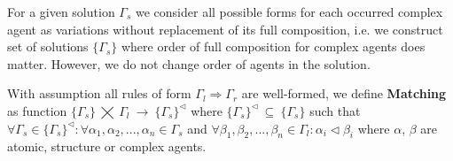 \documentclass{entcs}
\renewcommand{\~}[0]{\texttildelow}
\begin{document}
\begin{definition}
For a given solution $\Gamma_s$ we consider all possible forms for each occurred complex agent as variations without replacement of its full composition, i.e. we construct set of solutions $\{\Gamma_s\}$ where order of full composition for complex agents does matter. However, we do not change order of agents in the solution.
\end{definition}

\begin{definition}
With assumption all rules of form $\Gamma_l\Rightarrow\Gamma_r$ are well-formed, we define \textbf{Matching} as function $\{\Gamma_s\}~\bigtimes~\Gamma_l~\rightarrow~\{\Gamma_s\}^{\lhd}$ where $\{\Gamma_s\}^{\lhd}~\subseteq~\{\Gamma_s\}$ such that $\forall \Gamma_s \in \{\Gamma_s\}^{\lhd} : \forall \alpha_1, \alpha_2, ..., \alpha_n \in \Gamma_s $ and $\forall \beta_1, \beta_2, ..., \beta_n \in \Gamma_l : \alpha_i \lhd \beta_i$ where $\alpha$, $\beta$ are atomic, structure or complex agents.
\end{definition}
\end{document}
